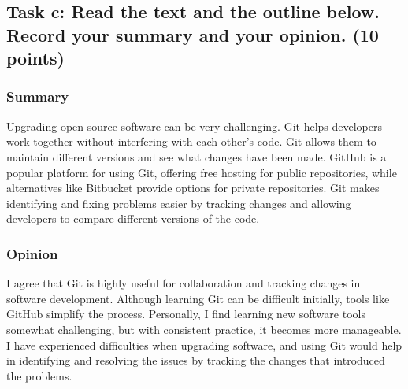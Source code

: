 \documentclass[a4paper,12pt]{article}
\begin{document}
\subsection{Task c: Read the text and the outline below. Record your summary and your opinion. (10 points)}

\subsubsection{Summary}

Upgrading open source software can be very challenging. Git helps developers work together without interfering with each other’s code. Git allows them to maintain different versions and see what changes have been made. GitHub is a popular platform for using Git, offering free hosting for public repositories, while alternatives like Bitbucket provide options for private repositories. Git makes identifying and fixing problems easier by tracking changes and allowing developers to compare different versions of the code.

\subsubsection{Opinion}

I agree that Git is highly useful for collaboration and tracking changes in software development. Although learning Git can be difficult initially, tools like GitHub simplify the process. Personally, I find learning new software tools somewhat challenging, but with consistent practice, it becomes more manageable. I have experienced difficulties when upgrading software, and using Git would help in identifying and resolving the issues by tracking the changes that introduced the problems.
\end{document}
